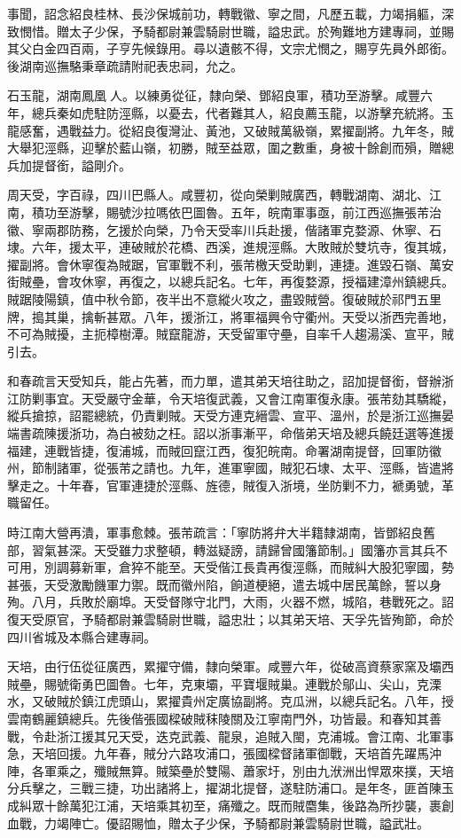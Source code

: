 \begin{pinyinscope}
事聞，詔念紹良桂林、長沙保城前功，轉戰徽、寧之間，凡歷五載，力竭捐軀，深致憫惜。贈太子少保，予騎都尉兼雲騎尉世職，謚忠武。於殉難地方建專祠，並賜其父白金四百兩，子亨先候錄用。尋以遺骸不得，文宗尤憫之，賜亨先員外郎銜。後湖南巡撫駱秉章疏請附祀表忠祠，允之。

石玉龍，湖南鳳凰人。以練勇從征，隸向榮、鄧紹良軍，積功至游擊。咸豐六年，總兵秦如虎駐防涇縣，以憂去，代者難其人，紹良薦玉龍，以游擊充統將。玉龍感奮，遇戰益力。從紹良復灣沚、黃池，又破賊萬級嶺，累擢副將。九年冬，賊大舉犯涇縣，迎擊於藍山嶺，初勝，賊至益眾，圍之數重，身被十餘創而殞，贈總兵加提督銜，謚剛介。

周天受，字百祿，四川巴縣人。咸豐初，從向榮剿賊廣西，轉戰湖南、湖北、江南，積功至游擊，賜號沙拉嗎依巴圖魯。五年，皖南軍事亟，前江西巡撫張芾治徽、寧兩郡防務，乞援於向榮，乃令天受率川兵赴援，偕諸軍克婺源、休寧、石埭。六年，援太平，連破賊於花橋、西溪，進規涇縣。大敗賊於雙坑寺，復其城，擢副將。會休寧復為賊踞，官軍戰不利，張芾檄天受助剿，連捷。進毀石嶺、萬安街賊壘，會攻休寧，再復之，以總兵記名。七年，再復婺源，授福建漳州鎮總兵。賊踞陵陽鎮，值中秋令節，夜半出不意縱火攻之，盡毀賊營。復破賊於祁門五里牌，搗其巢，擒斬甚眾。八年，援浙江，將軍福興令守衢州。天受以浙西完善地，不可為賊擾，主扼樟樹潭。賊竄龍游，天受留軍守壘，自率千人趨湯溪、宣平，賊引去。

和春疏言天受知兵，能占先著，而力單，遣其弟天培往助之，詔加提督銜，督辦浙江防剿事宜。天受嚴守金華，令天培復武義，又會江南軍復永康。張芾劾其驕縱，縱兵搶掠，詔罷總統，仍責剿賊。天受方連克縉雲、宣平、溫州，於是浙江巡撫晏端書疏陳援浙功，為白被劾之枉。詔以浙事漸平，命偕弟天培及總兵饒廷選等進援福建，連戰皆捷，復浦城，而賊回竄江西，復犯皖南。命署湖南提督，回軍防徽州，節制諸軍，從張芾之請也。九年，進軍寧國，賊犯石埭、太平、涇縣，皆遣將擊走之。十年春，官軍連捷於涇縣、旌德，賊復入浙境，坐防剿不力，褫勇號，革職留任。

時江南大營再潰，軍事愈棘。張芾疏言：「寧防將弁大半籍隸湖南，皆鄧紹良舊部，習氣甚深。天受雖力求整頓，轉滋疑謗，請歸曾國籓節制。」國籓亦言其兵不可用，別調募新軍，倉猝不能至。天受偕江長貴再復涇縣，而賊糾大股犯寧國，勢甚張，天受激勵饑軍力禦。既而徽州陷，餉道梗絕，遣去城中居民萬餘，誓以身殉。八月，兵敗於廟埠。天受督隊守北門，大雨，火器不燃，城陷，巷戰死之。詔復天受原官，予騎都尉兼雲騎尉世職，謚忠壯；以其弟天培、天孚先皆殉節，命於四川省城及本縣合建專祠。

天培，由行伍從征廣西，累擢守備，隸向榮軍。咸豐六年，從破高資蔡家窯及壩西賊壘，賜號衛勇巴圖魯。七年，克東壩，平寶堰賊巢。連戰於鄔山、尖山，克溧水，又破賊於鎮江虎頭山，累擢貴州定廣協副將。克瓜洲，以總兵記名。八年，授雲南鶴麗鎮總兵。先後偕張國樑破賊秣陵關及江寧南門外，功皆最。和春知其善戰，令赴浙江援其兄天受，迭克武義、龍泉，追賊入閩，克浦城。會江南、北軍事急，天培回援。九年春，賊分六路攻浦口，張國樑督諸軍御戰，天培首先躍馬沖陣，各軍乘之，殲賊無算。賊築壘於雙陽、蕭家圩，別由九洑洲出悍眾來撲，天培分兵擊之，三戰三捷，功出諸將上，擢湖北提督，遂駐防浦口。是年冬，匪首陳玉成糾眾十餘萬犯江浦，天培乘其初至，痛殲之。既而賊麕集，後路為所抄襲，裹創血戰，力竭陣亡。優詔賜恤，贈太子少保，予騎都尉兼雲騎尉世職，謚武壯。


\end{pinyinscope}
